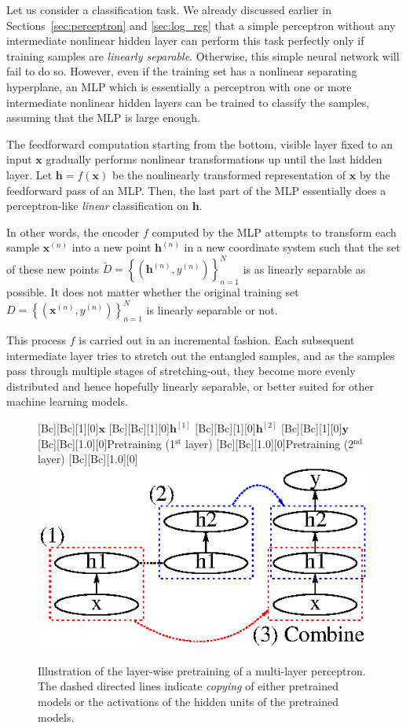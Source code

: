 \documentclass[dissertation,nocontribution,draft*]{aaltoseries}
\newcommand{\qlay}[1]{\left[#1\right]}
\newcommand{\vect}[1]{\mathbf{#1}}
\newcommand{\vh}[0]{\vect{h}}
\newcommand{\vx}[0]{\vect{x}}
\newcommand{\vy}[0]{\vect{y}}
\begin{document}
Let us consider a classification task. We already
discussed earlier in Sections~\ref{sec:perceptron} and
\ref{sec:log_reg} that a simple perceptron without any
intermediate nonlinear hidden layer can perform this task
perfectly only if training samples are \textit{linearly
separable}. Otherwise, this simple neural network will fail to
do so.  However, even
if the training set has a nonlinear separating hyperplane,
an MLP which is essentially a perceptron with one or more
intermediate nonlinear hidden layers can be trained to
classify the samples, assuming that the MLP is large enough.

The feedforward computation starting from the bottom,
visible layer fixed to an input $\vx$ gradually performs
nonlinear transformations up until the last hidden layer.
Let $\vh=f(\vx)$ be the nonlinearly transformed
representation of $\vx$ by the feedforward pass of an MLP.
Then, the last part of the MLP essentially does a
perceptron-like \textit{linear} classification on $\vh$.

In other words, the encoder $f$ computed by the MLP attempts to
transform each sample $\vx^{(n)}$ into a new point
$\vh^{(n)}$ in a new coordinate system such that the set of
these new points $\tilde{D} = \left\{ (\vh^{(n)}, y^{(n)})
\right\}_{n=1}^N$ is as linearly separable as possible. It
does not matter whether the original training set $D=\left\{
(\vx^{(n)},y^{(n)}) \right\}_{n=1}^N$ is linearly
separable or not.

This process $f$ is carried out in an incremental fashion. Each
subsequent intermediate layer tries to stretch out the
entangled samples, and as the samples pass through multiple
stages of stretching-out, they become more evenly
distributed and hence hopefully linearly separable, or
better suited for other machine learning models. 

\begin{figure}[t]
    \centering
    [Bc][Bc][1][0]{$\vx$}
    [Bc][Bc][1][0]{$\vh^{\qlay{1}}$}
    [Bc][Bc][1][0]{$\vh^{\qlay{2}}$}
    [Bc][Bc][1][0]{$\vy$}
    [Bc][Bc][1.0][0]{Pretraining
    (1$^\text{st}$ layer)}
    [Bc][Bc][1.0][0]{Pretraining
    (2$^\text{nd}$ layer)}
    [Bc][Bc][1.0][0]{}
    \includegraphics[width=0.7\columnwidth]{figures/pretrain_mlp.eps}
    \caption{Illustration of the layer-wise pretraining of
    a multi-layer perceptron. The dashed directed lines
    indicate \textit{copying} of either pretrained models or
    the activations of the hidden units of the pretrained
    models.}
    \label{fig:incr_feat}
\end{figure}
\end{document}
